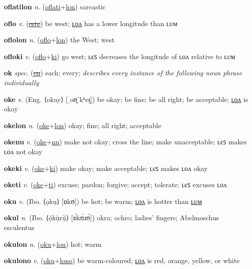 \textbf{\hypertarget{oflatilon}{oflatilon}} \textit{n.} (\hyperlink{oflati}{oflati}+\allowbreak \hyperlink{lon}{lon})
sarcastic

\textbf{\hypertarget{oflo}{oflo}} \textit{v.} (\hyperlink{este}{\sout{este}})
be west; \hyperlink{oflolon}{ʟᴏᴧ} has a lower longitude than ʟᴜᴍ

\textbf{\hypertarget{oflolon}{oflolon}} \textit{n.} (\hyperlink{oflo}{oflo}+\allowbreak \hyperlink{lon}{lon})
the West; west

\textbf{\hypertarget{ofloki}{ofloki}} \textit{v.} (\hyperlink{oflo}{oflo}+\allowbreak \hyperlink{ki}{ki})
go west; ʟєꜱ decreases the longitude of ʟᴏᴧ relative to ʟᴜᴍ

\textbf{\hypertarget{ok}{ok}} \textit{spec.} (\hyperlink{en}{\sout{en}})
each; every; \textit{describes every instance of the following noun phrase individually}

\textbf{\hypertarget{oke}{oke}} \textit{v.} (Eng. ⟨okay⟩ [ˌoʊ̯ˈkʰeɪ̯])
be okay; be fine; be all right; be acceptable; \hyperlink{okelon}{ʟᴏᴧ} is okay

\textbf{\hypertarget{okelon}{okelon}} \textit{n.} (\hyperlink{oke}{oke}+\allowbreak \hyperlink{lon}{lon})
okay; fine; all right; acceptable

\textbf{\hypertarget{okenu}{okenu}} \textit{v.} (\hyperlink{oke}{oke}+\allowbreak \hyperlink{nu}{nu})
make not okay; cross the line; make unacceptable; ʟєꜱ makes ʟᴏᴧ not okay

\textbf{\hypertarget{okeki}{okeki}} \textit{v.} (\hyperlink{oke}{oke}+\allowbreak \hyperlink{ki}{ki})
make okay; make acceptable; ʟєꜱ makes ʟᴏᴧ okay

\textbf{\hypertarget{oketi}{oketi}} \textit{v.} (\hyperlink{oke}{oke}+\allowbreak \hyperlink{ti}{ti})
excuse; pardon; forgive; accept; tolerate; ʟєꜱ excuses ʟᴏᴧ

\textbf{\hypertarget{oku}{oku}} \textit{v.} (Ibo. ⟨ọkụ⟩ [ɒkʊ])
be hot; be warm; \hyperlink{okulon}{ʟᴏᴧ} is hotter than \hyperlink{okulum}{ʟᴜᴍ}

\textbf{\hypertarget{okul}{okul}} \textit{n.} (Ibo. ⟨ọ́kụ̀rụ̀⟩ [ɒ́kʊ̀ɹʊ̀])
okra; ochro; ladies’ fingers; Abelmoschus esculentus

\textbf{\hypertarget{okulon}{okulon}} \textit{n.} (\hyperlink{oku}{oku}+\allowbreak \hyperlink{lon}{lon})
hot; warm

\textbf{\hypertarget{okulono}{okulono}} \textit{v.} (\hyperlink{oku}{oku}+\allowbreak \hyperlink{lono}{lono})
be warm-coloured; \hyperlink{okulonolon}{ʟᴏᴧ} is red, orange, yellow, or white

